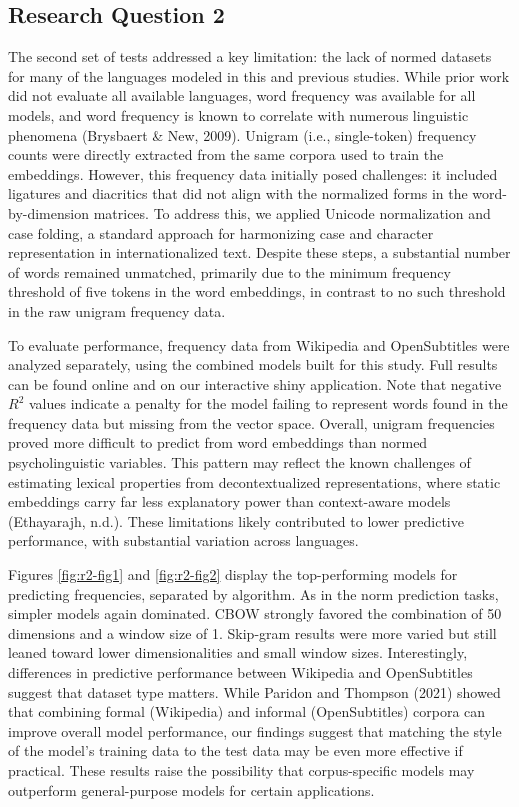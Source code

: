 \documentclass[
  man]{apa6}
\begin{document}
\subsection{Research Question 2}\label{research-question-2}

The second set of tests addressed a key limitation: the lack of normed datasets for many of the languages modeled in this and previous studies. While prior work did not evaluate all available languages, word frequency was available for all models, and word frequency is known to correlate with numerous linguistic phenomena (Brysbaert \& New, 2009). Unigram (i.e., single-token) frequency counts were directly extracted from the same corpora used to train the embeddings. However, this frequency data initially posed challenges: it included ligatures and diacritics that did not align with the normalized forms in the word-by-dimension matrices. To address this, we applied Unicode normalization and case folding, a standard approach for harmonizing case and character representation in internationalized text. Despite these steps, a substantial number of words remained unmatched, primarily due to the minimum frequency threshold of five tokens in the word embeddings, in contrast to no such threshold in the raw unigram frequency data.

To evaluate performance, frequency data from Wikipedia and OpenSubtitles were analyzed separately, using the combined models built for this study. Full results can be found online and on our interactive shiny application. Note that negative \(R^2\) values indicate a penalty for the model failing to represent words found in the frequency data but missing from the vector space. Overall, unigram frequencies proved more difficult to predict from word embeddings than normed psycholinguistic variables. This pattern may reflect the known challenges of estimating lexical properties from decontextualized representations, where static embeddings carry far less explanatory power than context-aware models (Ethayarajh, n.d.). These limitations likely contributed to lower predictive performance, with substantial variation across languages.

Figures \ref{fig:r2-fig1} and \ref{fig:r2-fig2} display the top-performing models for predicting frequencies, separated by algorithm. As in the norm prediction tasks, simpler models again dominated. CBOW strongly favored the combination of 50 dimensions and a window size of 1. Skip-gram results were more varied but still leaned toward lower dimensionalities and small window sizes. Interestingly, differences in predictive performance between Wikipedia and OpenSubtitles suggest that dataset type matters. While Paridon and Thompson (2021) showed that combining formal (Wikipedia) and informal (OpenSubtitles) corpora can improve overall model performance, our findings suggest that matching the style of the model's training data to the test data may be even more effective if practical. These results raise the possibility that corpus-specific models may outperform general-purpose models for certain applications.
\end{document}
